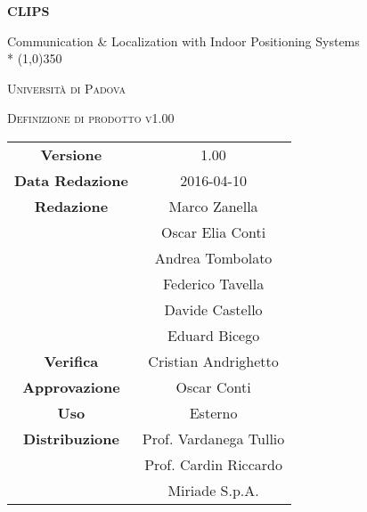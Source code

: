 \documentclass[a4paper,12pt]{article}
\author{}
\date{03/03/2016}
\begin{document}
\begin{titlepage}
	\centering
	{\huge\bfseries CLIPS\par}
	Communication \& Localization with Indoor Positioning Systems \\*
	\line(1,0){350} \\
	{\scshape\LARGE Università di Padova \par}
	\vspace{1cm}
	{\scshape\Large Definizione di prodotto v1.00\par}
	\logo
	
	\vfill \vfill
		\begin{tabular}{c|c}
			{\hfill \textbf{Versione}} 			& 1.00				\\
			{\hfill\textbf{Data Redazione}} 	& 2016-04-10	\\
			{\hfill\textbf{Redazione}} 			& Marco Zanella \\
												& Oscar Elia Conti \\
												& Andrea Tombolato \\
												& Federico Tavella \\
												& Davide Castello \\
												& Eduard Bicego 	\\ 
			{\hfill\textbf{Verifica}} 			& Cristian Andrighetto \\
			{\hfill\textbf{Approvazione}} 		& Oscar Conti		\\ 
			{\hfill\textbf{Uso}} 				& Esterno			\\ 
			{\hfill\textbf{Distribuzione}} 		& Prof. Vardanega Tullio \\
												& Prof. Cardin Riccardo \\
												& Miriade S.p.A. \\
		\end{tabular}
	\end{titlepage}
	
	\newpage
	\pagestyle{myfront}
		
	\newpage
		\tableofcontents
	\newpage
		\listoffigures	
	\label{LastFrontPage}
	\newpage
	
	\pagestyle{mymain}
	
	\newpage
		
		
	\newpage
		
		
	\newpage
		
		
	\newpage
		
	\newpage
		
		
	\newpage
		
		
	\newpage
	
	\newpage
		
		
		
	\label{LastPage}
\end{document}
